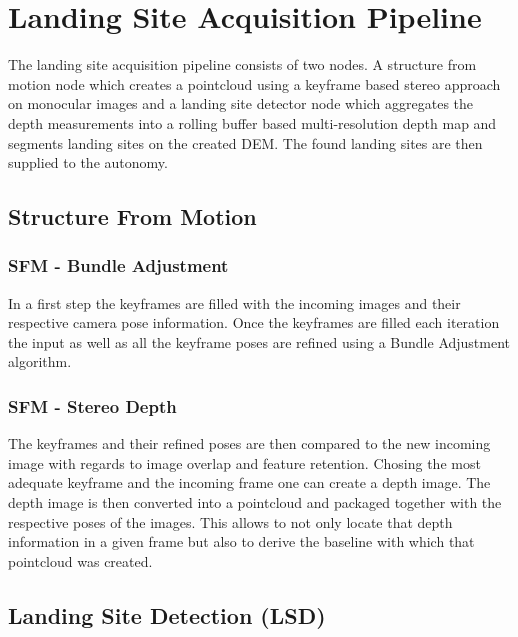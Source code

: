 \section{Landing Site Acquisition Pipeline}\label{sec:setup:LSD}

The landing site acquisition pipeline consists of two nodes. A structure from motion node \citep{SFM} which creates a pointcloud using a keyframe based stereo approach on monocular images and a landing site detector node \citep{LSD1, LSD2} which aggregates the depth measurements into a rolling buffer based multi-resolution depth map and segments landing sites on the created DEM. The found landing sites are then supplied to the autonomy. 

\subsection{Structure From Motion}\label{subsec:setup:SFM}

\subsubsection{SFM - Bundle Adjustment}



In a first step the keyframes are filled with the incoming images and their respective camera pose information. Once the keyframes are filled each iteration the input as well as all the keyframe poses are refined using a Bundle Adjustment algorithm. 

\subsubsection{SFM - Stereo Depth}

The keyframes and their refined poses are then compared to the new incoming image with regards to image overlap and feature retention. Chosing the most adequate keyframe and the incoming frame one can create a depth image. The depth image is then converted into a pointcloud and packaged together with the respective poses of the images. This allows to not only locate that depth information in a given frame but also to derive the baseline with which that pointcloud was created.

\subsection{Landing Site Detection (LSD)}\label{subsec:setup:LSD}

